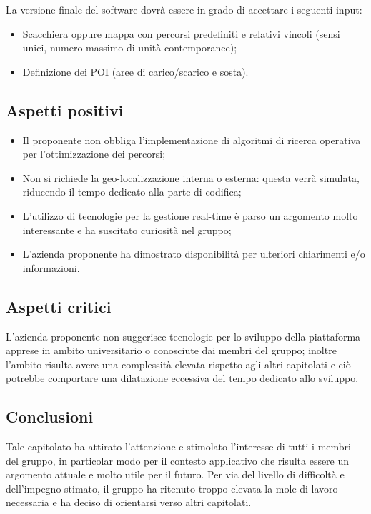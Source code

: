 La versione finale del software dovrà essere in grado di accettare i seguenti input:
\begin{itemize}
\item Scacchiera oppure mappa con percorsi predefiniti e relativi vincoli (sensi unici, numero massimo di unità contemporanee);
\item Definizione dei POI (aree di carico/scarico e sosta).
\end{itemize}

\subsection{Aspetti positivi}
\begin{itemize}
\item Il proponente non obbliga l'implementazione di algoritmi di ricerca operativa per l'ottimizzazione dei percorsi;
\item Non si richiede la geo-localizzazione interna o esterna: questa verrà simulata, riducendo il tempo dedicato alla parte di codifica;
\item L'utilizzo di tecnologie per la gestione real-time è parso un argomento molto interessante e ha suscitato curiosità nel gruppo;
\item L'azienda proponente ha dimostrato disponibilità per ulteriori chiarimenti e/o informazioni.
\end{itemize}

\subsection{Aspetti critici}
L'azienda proponente non suggerisce tecnologie per lo sviluppo della piattaforma apprese in ambito universitario o conosciute dai membri del gruppo; inoltre l'ambito risulta avere una complessità elevata rispetto agli altri capitolati e ciò potrebbe comportare una dilatazione eccessiva del tempo dedicato allo sviluppo.

\subsection{Conclusioni}
Tale capitolato ha attirato l'attenzione e stimolato l'interesse di tutti i membri del gruppo, in particolar modo per il contesto applicativo che risulta essere un argomento attuale e molto utile per il futuro.
Per via del livello di difficoltà e dell'impegno stimato, il gruppo ha ritenuto troppo elevata la mole di lavoro necessaria e ha deciso di orientarsi verso altri capitolati. 

